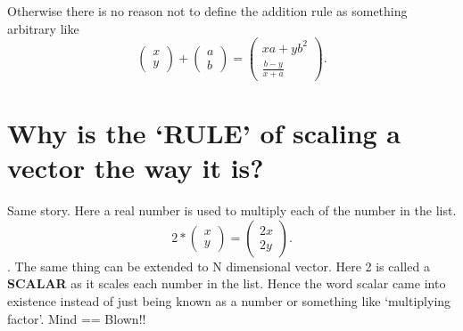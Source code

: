 \documentclass[12pt]{article}
\newcommand{\comment}[1]{}
\begin{document}
Otherwise there is no reason not to define the addition rule as something arbitrary like
\[
\comment{Column-Vector: x,y} \begin{pmatrix} x \\ y \end{pmatrix} + \comment{Column-Vector: a,b} \begin{pmatrix} a \\ b \end{pmatrix} = 
\comment{Column-Vector: xa + yb^2, \frac{b - y}{x + a}} \begin{pmatrix} xa + yb^2 \\  \frac{b - y}{x + a} \end{pmatrix}
.\]

\section{Why is the `RULE' of scaling a vector the way it is?}
Same story. Here a real number is used to multiply each of the number in the list.
\[
2 * \comment{Column-Vector: x, y} \begin{pmatrix} x \\  y \end{pmatrix} = \comment{Column-Vector: 2x, 2y} \begin{pmatrix} 2x \\  2y \end{pmatrix}
.\]. The same thing can be extended to N dimensional vector. Here 2 is called a \textbf{SCALAR} as it scales each number in the list. Hence the word scalar came into existence instead of just being known as a number or something like `multiplying factor'. Mind == Blown!!
\end{document}
